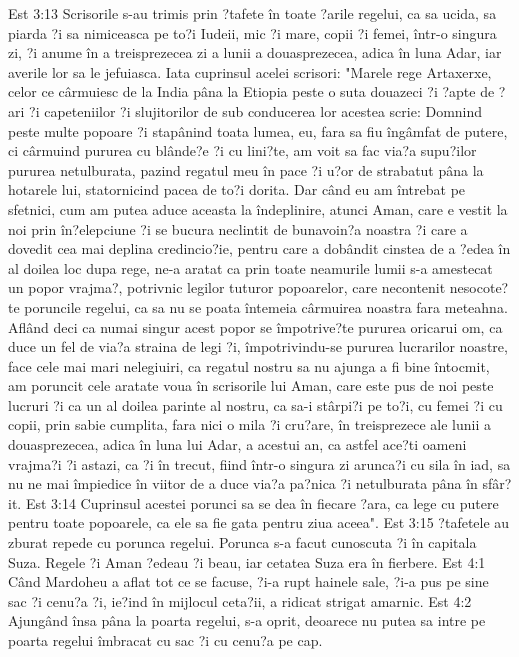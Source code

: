 Est 3:13  Scrisorile s-au trimis prin ?tafete în toate ?arile regelui, ca sa ucida, sa piarda ?i sa nimiceasca pe to?i Iudeii, mic ?i mare, copii ?i femei, într-o singura zi, ?i anume în a treisprezecea zi a lunii a douasprezecea, adica în luna Adar, iar averile lor sa le jefuiasca. Iata cuprinsul acelei scrisori: "Marele rege Artaxerxe, celor ce cârmuiesc de la India pâna la Etiopia peste o suta douazeci ?i ?apte de ?ari ?i capeteniilor ?i slujitorilor de sub conducerea lor acestea scrie: Domnind peste multe popoare ?i stapânind toata lumea, eu, fara sa fiu îngâmfat de putere, ci cârmuind pururea cu blânde?e ?i cu lini?te, am voit sa fac via?a supu?ilor pururea netulburata, pazind regatul meu în pace ?i u?or de strabatut pâna la hotarele lui, statornicind pacea de to?i dorita. Dar când eu am întrebat pe sfetnici, cum am putea aduce aceasta la îndeplinire, atunci Aman, care e vestit la noi prin în?elepciune ?i se bucura neclintit de bunavoin?a noastra ?i care a dovedit cea mai deplina credincio?ie, pentru care a dobândit cinstea de a ?edea în al doilea loc dupa rege, ne-a aratat ca prin toate neamurile lumii s-a amestecat un popor vrajma?, potrivnic legilor tuturor popoarelor, care necontenit nesocote?te poruncile regelui, ca sa nu se poata întemeia cârmuirea noastra fara meteahna. Aflând deci ca numai singur acest popor se împotrive?te pururea oricarui om, ca duce un fel de via?a straina de legi ?i, împotrivindu-se pururea lucrarilor noastre, face cele mai mari nelegiuiri, ca regatul nostru sa nu ajunga a fi bine întocmit, am poruncit cele aratate voua în scrisorile lui Aman, care este pus de noi peste lucruri ?i ca un al doilea parinte al nostru, ca sa-i stârpi?i pe to?i, cu femei ?i cu copii, prin sabie cumplita, fara nici o mila ?i cru?are, în treisprezece ale lunii a douasprezecea, adica în luna lui Adar, a acestui an, ca astfel ace?ti oameni vrajma?i ?i astazi, ca ?i în trecut, fiind într-o singura zi arunca?i cu sila în iad, sa nu ne mai împiedice în viitor de a duce via?a pa?nica ?i netulburata pâna în sfâr?it.
Est 3:14  Cuprinsul acestei porunci sa se dea în fiecare ?ara, ca lege cu putere pentru toate popoarele, ca ele sa fie gata pentru ziua aceea".
Est 3:15  ?tafetele au zburat repede cu porunca regelui. Porunca s-a facut cunoscuta ?i în capitala Suza. Regele ?i Aman ?edeau ?i beau, iar cetatea Suza era în fierbere.
Est 4:1  Când Mardoheu a aflat tot ce se facuse, ?i-a rupt hainele sale, ?i-a pus pe sine sac ?i cenu?a ?i, ie?ind în mijlocul ceta?ii, a ridicat strigat amarnic.
Est 4:2  Ajungând însa pâna la poarta regelui, s-a oprit, deoarece nu putea sa intre pe poarta regelui îmbracat cu sac ?i cu cenu?a pe cap.
